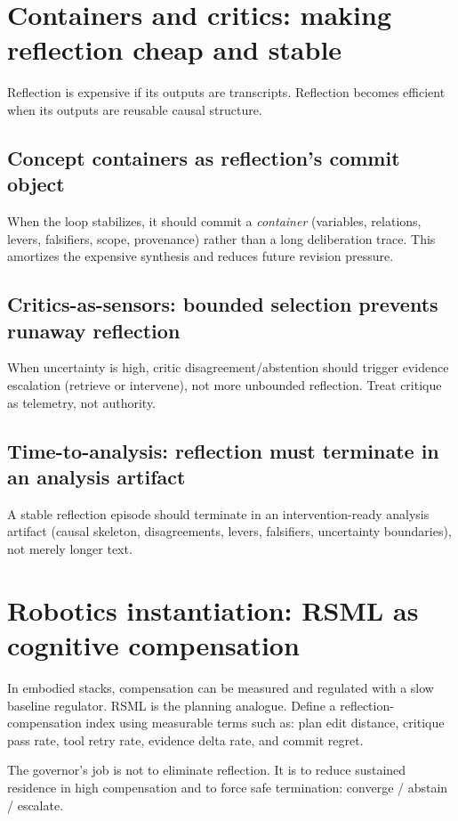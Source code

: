 \documentclass[11pt]{article}
\begin{document}
\section{Containers and critics: making reflection cheap and stable}
Reflection is expensive if its outputs are transcripts. Reflection becomes efficient when its outputs are
reusable causal structure.

\subsection{Concept containers as reflection’s commit object}
When the loop stabilizes, it should commit a \emph{container} (variables, relations, levers, falsifiers, scope,
provenance) rather than a long deliberation trace. This amortizes the expensive synthesis and reduces future
revision pressure.

\subsection{Critics-as-sensors: bounded selection prevents runaway reflection}
When uncertainty is high, critic disagreement/abstention should trigger evidence escalation (retrieve or
intervene), not more unbounded reflection. Treat critique as telemetry, not authority.

\subsection{Time-to-analysis: reflection must terminate in an analysis artifact}
A stable reflection episode should terminate in an intervention-ready analysis artifact (causal skeleton,
disagreements, levers, falsifiers, uncertainty boundaries), not merely longer text.

\section{Robotics instantiation: RSML as cognitive compensation}
In embodied stacks, compensation can be measured and regulated with a slow baseline regulator.
RSML is the planning analogue. Define a reflection-compensation index using measurable terms such as:
plan edit distance, critique pass rate, tool retry rate, evidence delta rate, and commit regret.

The governor’s job is not to eliminate reflection. It is to reduce sustained residence in high compensation
and to force safe termination: converge / abstain / escalate.
\end{document}
